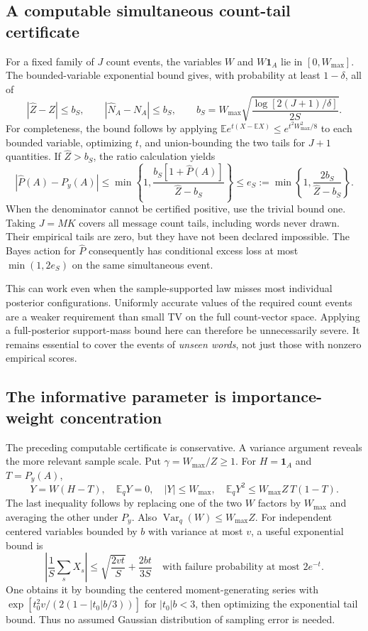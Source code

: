 \documentclass[10pt,a4paper]{article}
\newcommand{\E}{\mathbb E}
\newcommand{\ind}{\mathbf 1}
\begin{document}
\subsection{A computable simultaneous count-tail certificate}
For a fixed family of $J$ count events, the variables $W$ and $W\ind_A$ lie in $[0,W_{\max}]$.
The bounded-variable exponential bound gives, with probability at least $1-\delta$, all of
\[
 |\widehat Z-Z|\leq b_S,\qquad
 |\widehat N_A-N_A|\leq b_S,\qquad
 b_S=W_{\max}\sqrt{\frac{\log[2(J+1)/\delta]}{2S}}.
\]
For completeness, the bound follows by applying
$\E e^{t(X-\E X)}\leq e^{t^2W_{\max}^2/8}$ to each bounded variable, optimizing $t$, and union-bounding
the two tails for $J+1$ quantities. If $\widehat Z>b_S$, the ratio calculation yields
\begin{equation}
 |\widehat P(A)-P_y(A)|
 \leq \min\!\left\{1,\frac{b_S[1+\widehat P(A)]}{\widehat Z-b_S}\right\}
 \leq e_S:=\min\!\left\{1,\frac{2b_S}{\widehat Z-b_S}\right\}.
 \label{eq:importance-computable}
\end{equation}
When the denominator cannot be certified positive, use the trivial bound one.
Taking $J=MK$ covers all message count tails, including words never drawn. Their empirical tails are zero,
but they have not been declared impossible. The Bayes action for $\widehat P$ consequently has conditional
excess loss at most $\min(1,2e_S)$ on the same simultaneous event.

This can work even when the sample-supported law misses most individual posterior configurations.
Uniformly accurate values of the required count events are a weaker requirement than small TV on the full
count-vector space. Applying a full-posterior support-mass bound here can therefore be unnecessarily severe.
It remains essential to cover the events of \emph{unseen words}, not just those with nonzero empirical scores.

\subsection{The informative parameter is importance-weight concentration}
The preceding computable certificate is conservative. A variance argument reveals the more relevant sample
scale. Put $\gamma=W_{\max}/Z\geq1$. For $H=\ind_A$ and $T=P_y(A)$,
\[
 Y=W(H-T),\quad \E_qY=0,\quad |Y|\leq W_{\max},\quad
 \E_qY^2\leq W_{\max}Z\,T(1-T).
\]
The last inequality follows by replacing one of the two $W$ factors by $W_{\max}$ and averaging the other
under $P_y$. Also $\operatorname{Var}_q(W)\leq W_{\max}Z$.
For independent centered variables bounded by $b$ with variance at most $v$, a useful exponential bound is
\[
 \left|\frac1S\sum_s X_s\right|
 \leq\sqrt{\frac{2vt}{S}}+\frac{2bt}{3S}
 \quad\text{with failure probability at most }2e^{-t}.
\]
One obtains it by bounding the centered moment-generating series with
$\exp[t_0^2v/(2(1-|t_0|b/3))]$ for $|t_0|b<3$, then optimizing the exponential tail bound.
Thus no assumed Gaussian distribution of sampling error is needed.
\end{document}

